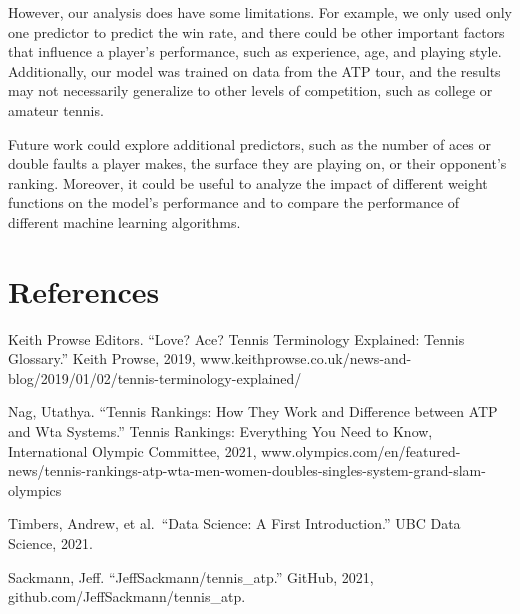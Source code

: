 \documentclass[
]{article}
\begin{document}
However, our analysis does have some limitations. For example, we only used only one predictor to predict the win rate, and there could be other important factors that influence a player's performance, such as experience, age, and playing style. Additionally, our model was trained on data from the ATP tour, and the results may not necessarily generalize to other levels of competition, such as college or amateur tennis.

Future work could explore additional predictors, such as the number of aces or double faults a player makes, the surface they are playing on, or their opponent's ranking. Moreover, it could be useful to analyze the impact of different weight functions on the model's performance and to compare the performance of different machine learning algorithms.

\hypertarget{references}{%
\section{References}\label{references}}

Keith Prowse Editors. ``Love? Ace? Tennis Terminology Explained: Tennis Glossary.'' Keith Prowse, 2019, www.keithprowse.co.uk/news-and-blog/2019/01/02/tennis-terminology-explained/

Nag, Utathya. ``Tennis Rankings: How They Work and Difference between ATP and Wta Systems.'' Tennis Rankings: Everything You Need to Know, International Olympic Committee, 2021, www.olympics.com/en/featured-news/tennis-rankings-atp-wta-men-women-doubles-singles-system-grand-slam-olympics

Timbers, Andrew, et al.~``Data Science: A First Introduction.'' UBC Data Science, 2021.

Sackmann, Jeff. ``JeffSackmann/tennis\_atp.'' GitHub, 2021, github.com/JeffSackmann/tennis\_atp.
\end{document}
